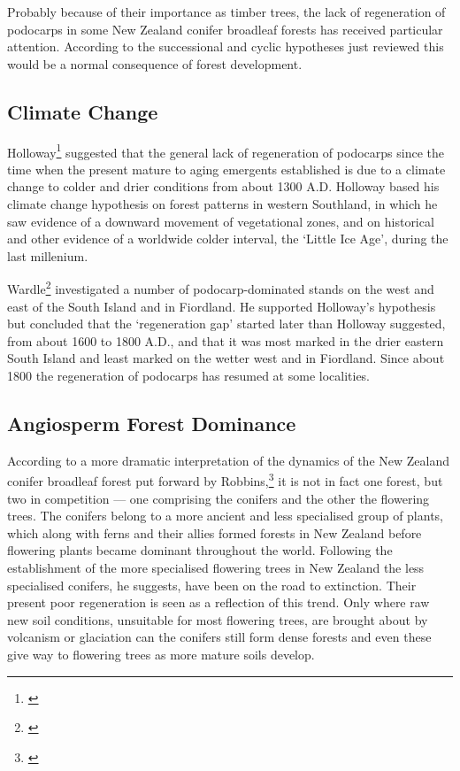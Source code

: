 Probably because of their importance as timber trees, the lack of regeneration of podocarps in some New Zealand conifer broadleaf forests has received particular attention.
According to the successional and cyclic hypotheses just reviewed this would be a normal consequence of forest development.

\subsection{Climate Change}

Holloway\footnote{\cite{holloway1954forests}} suggested that the general lack of regeneration of podocarps since the time when the present mature to aging emergents established is due to a climate change to colder and drier conditions from about 1300 A.D.
Holloway based his climate change hypothesis on forest patterns in western Southland, in which he saw evidence of a downward movement of vegetational zones, and on historical and other evidence of a worldwide colder interval, the `Little Ice Age', during the last millenium.

Wardle\footnote{\cite{wardle1963regeneration}} investigated a number of podocarp-dominated stands on the west and east of the South Island and in Fiordland.
He supported Holloway's hypothesis but concluded that the `regeneration gap' started later than Holloway suggested, from about 1600 to 1800 A.D., and that it was most marked in the drier eastern South Island and least marked on the wetter west and in Fiordland.
Since about 1800 the regeneration of podocarps has resumed at some localities.

\subsection{Angiosperm Forest Dominance}

According to a more dramatic interpretation of the dynamics of the New Zealand conifer broadleaf forest put forward by Robbins,\footnote{\cite{robbins1962podocarp}} it is not in fact one forest, but two in competition --- one comprising the conifers and the other the flowering trees.
The conifers belong to a more ancient and less specialised group of plants, which along with ferns and their allies formed forests in New Zealand before flowering plants became dominant throughout the world.
Following the establishment of the more specialised flowering trees in New Zealand the less specialised conifers, he suggests, have been on the road to extinction.
Their present poor regeneration is seen as a reflection of this trend.
Only where raw new soil conditions, unsuitable for most flowering trees, are brought about by volcanism or glaciation can the conifers still form dense forests and even these give way to flowering trees as more mature soils develop.

